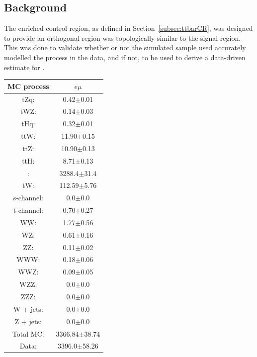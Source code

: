 \subsection{\ttbar Background}\label{subsec:ttbarEstimation}
The \ttbar enriched control region, as defined in Section~\ref{subsec:ttbarCR}, was designed to provide an orthogonal region was topologically similar to the signal region.
This was done to validate whether or not the simulated \ttbar sample used accurately modelled the \ttbar process in the data, and if not, to be used to derive a data-driven estimate for \ttbar.

\begin{table}[htbp]
\label{tab:ttbarCR}
  \centering
 \begin{tabular}{cc}
   \hline
   \textbf{MC process} & \textbf{$e\mu$}  \\
   \hline
	tZq\@: & 0.42$\pm$0.01  \\
	tWZ\@: & 0.14$\pm$0.03  \\
	tHq\@: & 0.32$\pm$0.01  \\
	ttW\@: & 11.90$\pm$0.15   \\
	ttZ\@: & 10.90$\pm$0.13   \\
	ttH\@: & 8.71$\pm$0.13  \\
	\ttbar: & 3288.4$\pm$31.4   \\
	tW\@: & 112.59$\pm$5.76   \\
	s-channel\@: &  0.0$\pm$0.0 \\
	t-channel\@: & 0.70$\pm$0.27 \\
	WW\@: & 1.77$\pm$0.56  \\
	WZ\@: & 0.61$\pm$0.16 \\
	ZZ\@: & 0.11$\pm$0.02 \\
	WWW\@: & 0.18$\pm$0.06     \\
	WWZ\@: & 0.09$\pm$0.05     \\
	WZZ\@: & 0.0$\pm$0.0     \\
	ZZZ\@: & 0.0$\pm$0.0     \\
	W + jets\@: & 0.0$\pm$0.0     \\
	Z + jets\@: & 0.0$\pm$0.0     \\
	\hline
	Total MC\@: & 3366.84$\pm$38.74     \\
	\hline
	Data\@: & 3396.0$\pm$58.26     \\
   \hline
 \end{tabular}
\end{table}

